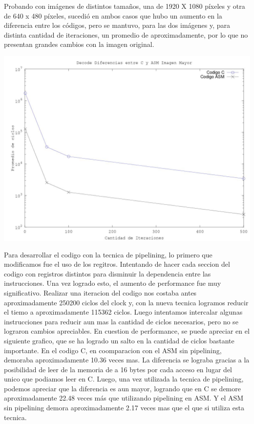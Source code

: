 Probando con im\'agenes de distintos tamaños, una de 1920 X 1080 p\'ixeles y otra de 640 x 480 p\'ixeles, sucedi\'o en ambos casos que hubo un aumento en la diferencia entre los c\'odigos, pero se mantuvo, para las dos im\'agenes y, para distinta cantidad de iteraciones, un promedio de aproximadamente, por lo que no presentan grandes cambios con la imagen original. 

\includegraphics[scale=0.7]{imagenes/DecodeMayor.jpg}


Para desarrollar el codigo con la tecnica de pipelining, lo primero que modificamos fue el uso de los regitros. Intentando de hacer cada seccion del codigo con registros distintos para disminuir la dependencia entre las instrucciones. Una vez logrado esto, el aumento de performance fue muy significativo. Realizar una iteracion del codigo nos costaba antes aproximadamente 250200 ciclos del clock y, con la nueva tecnica logramos reducir el tiemo a aproximadamente 115362 ciclos.
\newline
Luego intentamos intercalar algunas instrucciones para reducir aun mas la cantidad de ciclos necesarios, pero no se lograron cambios apreciables.
\newline
\newline
En cuestion de performance, se puede apreciar en el siguiente grafico, que se ha logrado un salto en la cantidad de ciclos bastante importante. En el codigo C, en coomparacion con el ASM sin pipelining, demoraba aproximadamente 10.36 veces mas. La diferencia se lograba gracias a la posibilidad de leer de la memoria de a 16 bytes por cada acceso en lugar del unico que podiamos leer en C. Luego, una vez utilizada la tecnica de pipelining, podemos apreciar que la diferencia es aun mayor, logrando que en C se demore aproximadamente 22.48 veces más que utilizando pipelining en ASM. Y el ASM sin pipelining demora aproximadamente 2.17 veces mas que el que si utiliza esta tecnica.
\newline

